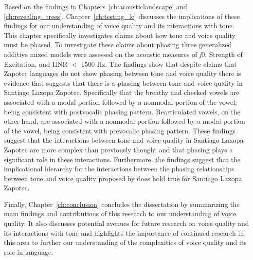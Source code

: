 Based on the findings in Chapters~\ref{ch:acousticlandscape} and \ref{ch:revealing_trees}, Chapter~\ref{ch:testing_lc} discusses the implications of these findings for our understanding of voice quality and its interactions with tone. This chapter specifically investigates  claims about how tone and voice quality must be phased. To investigate these claims about phasing three generalized additive mixed models were assessed on the acoustic measures of \textit{f}0, Strength of Excitation, and HNR $<$ 1500 Hz. The findings show that despite  claims that Zapotec languages do not show phasing between tone and voice quality there is evidence that suggests that there is a phasing between tone and voice quality in Santiago Laxopa Zapotec. Specifically that the breathy and checked vowels are associated with a modal portion followed by a nonmodal portion of the vowel, being consistent with  postvocalic phasing pattern. Rearticulated vowels, on the other hand, are associated with a nonmodal portion followed by a modal portion of the vowel, being consistent with  prevocalic phasing pattern. These findings suggest that the interactions between tone and voice quality in Santiago Laxopa Zapotec are more complex than previously thought and that phasing plays a significant role in these interactions. Furthermore, the findings suggest that the implicational hierarchy for the interactions between the phasing relationships between tone and voice quality proposed by \citet{silvermanLaryngealComplexityOtomanguean1997} does hold true for Santiago Laxopa Zapotec. 

Finally, Chapter~\ref{ch:conclusion} concludes the dissertation by summarizing the main findings and contributions of this research to our understanding of voice quality. It also discusses potential avenues for future research on voice quality and its interactions with tone and highlights the importance of continued research in this area to further our understanding of the complexities of voice quality and its role in language.

